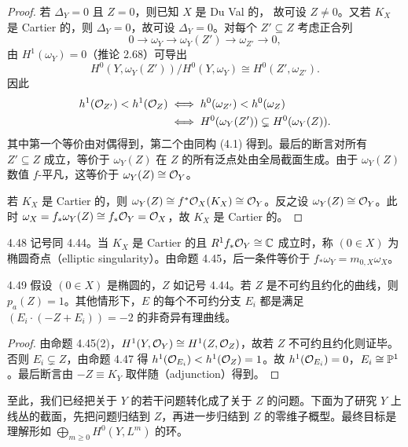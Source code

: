 \begin{proof}
若 $\Delta_Y=0$ 且 $Z=0$，则已知 $X$ 是 Du Val 的，
故可设 $Z\neq 0$。又若 $K_X$ 是 Cartier 的，则 $\Delta_Y=0$，故可设 $\Delta_Y=0$。对每个 $Z'\subseteq Z$ 考虑正合列
\[ 0\to\omega_Y\to\omega_Y(Z')\to\omega_{Z'}\to 0, \]
由 $H^1(\omega_Y)=0$（推论 2.68）可导出
\begin{equation}
H^0(Y,\omega_Y(Z'))/H^0(Y,\omega_Y)\cong H^0(Z',\omega_{Z'}). \tag{4.1}
\end{equation}
因此
\begin{align*}
h^1(\mathcal{O}_{Z'})<h^1(\mathcal{O}_Z) &\iff h^0(\omega_{Z'})<h^0(\omega_Z) \\
&\iff H^0(\omega_Y(Z'))\subsetneq H^0(\omega_Y(Z)).
\end{align*}
其中第一个等价由对偶得到，第二个由同构 (4.1) 得到。最后的断言对所有 $Z'\subseteq Z$ 成立，等价于 $\omega_Y(Z)$ 在 $Z$ 的所有泛点处由全局截面生成。由于 $\omega_Y(Z)$ 数值 $f$-平凡，这等价于 $\omega_Y(Z)\cong\mathcal{O}_Y$。

若 $K_X$ 是 Cartier 的，则 $\omega_Y(Z)\cong f^*\mathcal{O}_X(K_X)\cong\mathcal{O}_Y$。反之设 $\omega_Y(Z)\cong\mathcal{O}_Y$。此时 $\omega_X=f_*\omega_Y(Z)\cong f_*\mathcal{O}_Y=\mathcal{O}_X$，故 $K_X$ 是 Cartier 的。
\end{proof}

\begin{definition}{4.48}
记号同 4.44。当 $K_X$ 是 Cartier 的且 $R^1f_*\mathcal{O}_Y\cong\mathbb{C}$ 成立时，称 $(0\in X)$ 为椭圆奇点（elliptic singularity）。由命题 4.45，后一条件等价于 $f_*\omega_Y=m_{0,X}\omega_X$。
\end{definition}

\begin{lemmap}{4.49}
假设 $(0\in X)$ 是椭圆的，$Z$ 如记号 4.44。若 $Z$ 是不可约且约化的曲线，则 $p_a(Z)=1$。其他情形下，$E$ 的每个不可约分支 $E_i$ 都是满足 $(E_i\cdot(-Z+E_i))=-2$ 的非奇异有理曲线。
\end{lemmap}

\begin{proof}
由命题 4.45(2)，$H^1(Y,\mathcal{O}_Y)\cong H^1(Z,\mathcal{O}_Z)$，故若 $Z$ 不可约且约化则证毕。否则 $E_i\subsetneq Z$，由命题 4.47 得 $h^1(\mathcal{O}_{E_i})<h^1(\mathcal{O}_Z)=1$。故 $h^1(\mathcal{O}_{E_i})=0$，$E_i\cong\mathbb{P}^1$。最后断言由 $-Z\equiv K_Y$ 取伴随（adjunction）得到。
\end{proof}

至此，我们已经把关于 $Y$ 的若干问题转化成了关于 $Z$ 的问题。下面为了研究 $Y$ 上线丛的截面，先把问题归结到 $Z$，再进一步归结到 $Z$ 的零维子概型。最终目标是理解形如 $\bigoplus_{m\ge 0}H^0(Y,L^m)$ 的环。

